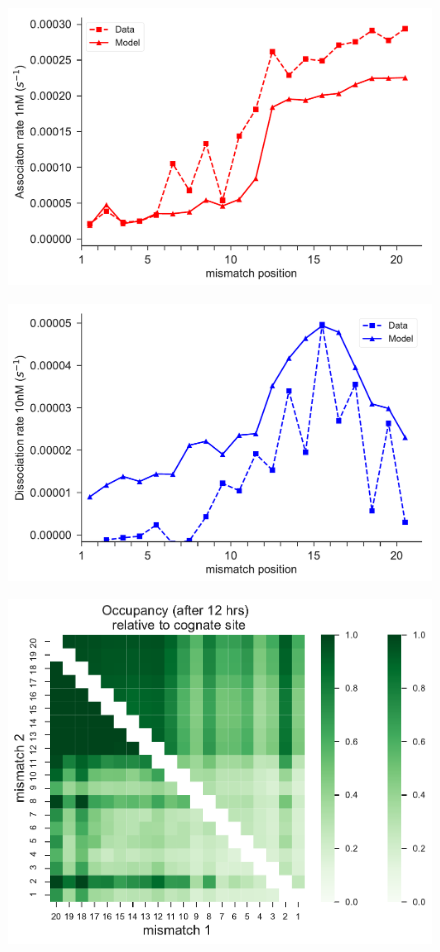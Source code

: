 \documentclass[a4paper,twoside]{revtex4-1}
\begin{document}
\begin{figure}[H]
\includegraphics[scale=0.5]{fig26_10_10_2018.pdf}
\end{figure}

\begin{figure}[H]
\includegraphics[scale=0.5]{fig27_10_10_2018.pdf}
\end{figure}

\begin{figure}[H]
\includegraphics[scale=0.5]{fig28_10_10_2018.pdf}
\end{figure}
\end{document}

